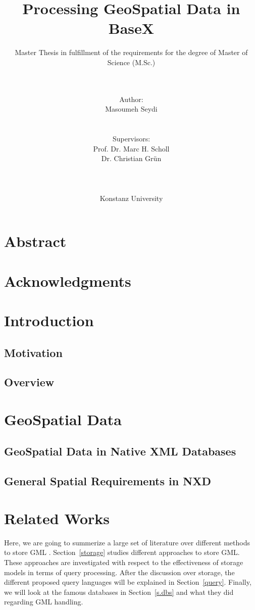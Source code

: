 \documentclass[a4paper,12pt]{article}
\title{Processing GeoSpatial Data in BaseX}
\subtitle{Master Thesis in fulfillment of the requirements for the degree of
Master of Science (M.Sc.)}
\author{\\\\Author: \\
	Masoumeh Seydi
	\\\\\\Supervisors: \\
	Prof. Dr. Marc H. Scholl \\ 
	Dr. Christian Gr{\"u}n \\
	\\\\\\
	Konstanz University}
\begin{document}
\maketitle
\thispagestyle{empty}

\newpage
\section*{Abstract}

\thispagestyle{empty}

\newpage
\section*{Acknowledgments}

\thispagestyle{empty}

\newpage
\tableofcontents

\thispagestyle{empty}
\newpage
\section{Introduction}
\setcounter{page}{1}

\subsection{Motivation}

\subsection{Overview}

\newpage
\section{GeoSpatial Data}

\subsection{GeoSpatial Data in Native XML Databases}

\subsection{General Spatial Requirements in NXD}
\newpage

\section{Related Works}
Here, we are going to summerize a large set of literature over different methods
to store GML \cite{gml}. Section~\ref{storage} studies
different approaches to store GML. These approaches are investigated
with respect to the effectiveness of storage models in terms of query processing.
After the discussion over storage, the different proposed query languages
will be explained in Section~\ref{query}. Finally, we will look at the
famous databases in Section~\ref{s.dbs} and what they did regarding GML
handling.
  
\end{document}
